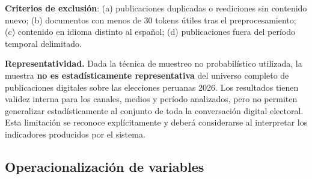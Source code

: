 \textbf{Criterios de exclusión}: (a) publicaciones duplicadas o reediciones sin contenido nuevo; (b) documentos con menos de 30 tokens útiles tras el preprocesamiento; (c) contenido en idioma distinto al español; (d) publicaciones fuera del período temporal delimitado.

\textbf{Representatividad.} Dada la técnica de muestreo no probabilístico utilizada, la muestra \textbf{no es estadísticamente representativa} del universo completo de publicaciones digitales sobre las elecciones peruanas 2026. Los resultados tienen validez interna para los canales, medios y período analizados, pero no permiten generalizar estadísticamente al conjunto de toda la conversación digital electoral. Esta limitación se reconoce explícitamente y deberá considerarse al interpretar los indicadores producidos por el sistema.

\subsection{Operacionalización de variables}
 

